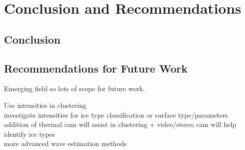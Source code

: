 \chapter{Conclusion and Recommendations}
\label{ch:conclusion}
\section{Conclusion}
\label{sec:ch9.section1}

\section{Recommendations for Future Work}
\label{sec:ch9.section2}

Emerging field so lots of scope for future work.

Use intensities in clustering
\\investigate intensities for ice type classification or surface type/parameters
\\addition of thermal cam will assist in clustering + video/stereo cam will help identify ice types
\\more advanced wave estimation methods